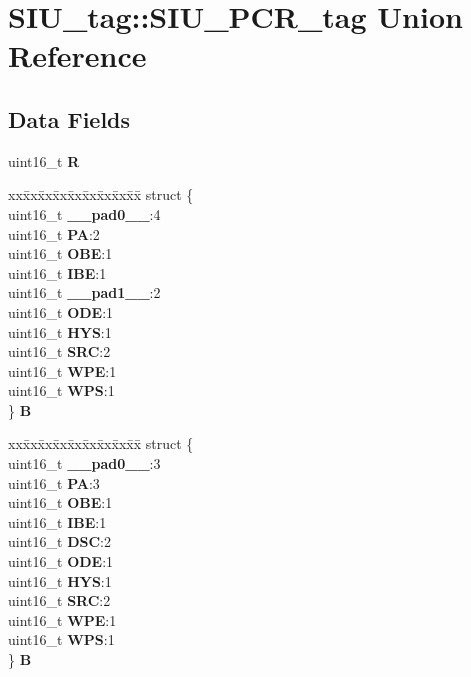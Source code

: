 \hypertarget{unionSIU__tag_1_1SIU__PCR__tag}{}\section{S\+I\+U\+\_\+tag\+::S\+I\+U\+\_\+\+P\+C\+R\+\_\+tag Union Reference}
\label{unionSIU__tag_1_1SIU__PCR__tag}
\subsection*{Data Fields}
\begin{DoxyCompactItemize}
\item 
\mbox{\label{unionSIU__tag_1_1SIU__PCR__tag_aedd68229224b772c083dda8a2685576e}} 
uint16\+\_\+t {\bfseries R}
\item 
\mbox{\label{unionSIU__tag_1_1SIU__PCR__tag_a8c8ccbc6d58e4e041abbc38174b0eaed}} 
\begin{tabbing}
xx\=xx\=xx\=xx\=xx\=xx\=xx\=xx\=xx\=\kill
struct \{\\
\>uint16\_t {\bfseries \_\_pad0\_\_}:4\\
\>uint16\_t {\bfseries PA}:2\\
\>uint16\_t {\bfseries OBE}:1\\
\>uint16\_t {\bfseries IBE}:1\\
\>uint16\_t {\bfseries \_\_pad1\_\_}:2\\
\>uint16\_t {\bfseries ODE}:1\\
\>uint16\_t {\bfseries HYS}:1\\
\>uint16\_t {\bfseries SRC}:2\\
\>uint16\_t {\bfseries WPE}:1\\
\>uint16\_t {\bfseries WPS}:1\\
\} {\bfseries B}\\

\end{tabbing}\item 
\mbox{\label{unionSIU__tag_1_1SIU__PCR__tag_a45af9a18ee8c81431164daf0dd767515}} 
\begin{tabbing}
xx\=xx\=xx\=xx\=xx\=xx\=xx\=xx\=xx\=\kill
struct \{\\
\>uint16\_t {\bfseries \_\_pad0\_\_}:3\\
\>uint16\_t {\bfseries PA}:3\\
\>uint16\_t {\bfseries OBE}:1\\
\>uint16\_t {\bfseries IBE}:1\\
\>uint16\_t {\bfseries DSC}:2\\
\>uint16\_t {\bfseries ODE}:1\\
\>uint16\_t {\bfseries HYS}:1\\
\>uint16\_t {\bfseries SRC}:2\\
\>uint16\_t {\bfseries WPE}:1\\
\>uint16\_t {\bfseries WPS}:1\\
\} {\bfseries B}\\


\end{tabbing}
\end{DoxyCompactItemize}
